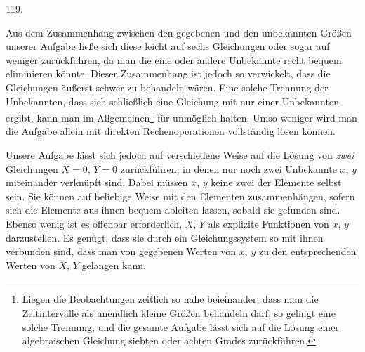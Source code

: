 \par\medskip
\begin{center}\hypertarget{native-166-article119}{}119.\end{center}
Aus dem Zusammenhang zwischen den gegebenen und den unbekannten Größen unserer Aufgabe ließe sich diese leicht auf sechs Gleichungen oder sogar auf weniger zurückführen, da man die eine oder andere Unbekannte recht bequem eliminieren könnte. Dieser Zusammenhang ist jedoch so verwickelt, dass die Gleichungen äußerst schwer zu behandeln wären. Eine solche Trennung der Unbekannten, dass sich schließlich eine Gleichung mit nur einer Unbekannten ergibt, kann man im Allgemeinen\footnote{Liegen die Beobachtungen zeitlich so nahe beieinander, dass man die Zeitintervalle als unendlich kleine Größen behandeln darf, so gelingt eine solche Trennung, und die gesamte Aufgabe lässt sich auf die Lösung einer algebraischen Gleichung siebten oder achten Grades zurückführen.} für unmöglich halten. Umso weniger wird man die Aufgabe allein mit direkten Rechenoperationen vollständig lösen können.

Unsere Aufgabe lässt sich jedoch auf verschiedene Weise auf die Lösung von \emph{zwei} Gleichungen $X=0$, $Y=0$ zurückführen, in denen nur noch zwei Unbekannte $x$, $y$ miteinander verknüpft sind. Dabei müssen $x$, $y$ keine zwei der Elemente selbst sein. Sie können auf beliebige Weise mit den Elementen zusammenhängen, sofern sich die Elemente aus ihnen bequem ableiten lassen, sobald sie gefunden sind. Ebenso wenig ist es offenbar erforderlich, $X$, $Y$ als explizite Funktionen von $x$, $y$ darzustellen. Es genügt, dass sie durch ein Gleichungssystem so mit ihnen verbunden sind, dass man von gegebenen Werten von $x$, $y$ zu den entsprechenden Werten von $X$, $Y$ gelangen kann.
